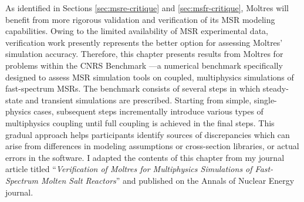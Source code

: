 As identified in Sections \ref{sec:msre-critique} and \ref{sec:msfr-critique},
Moltres will benefit from more rigorous validation and verification of its
\gls{MSR} modeling capabilities. Owing to the limited availability of \gls{MSR}
experimental data, verification work presently represents the better option for
assessing Moltres' simulation accuracy. Therefore, this chapter presents
results from Moltres for problems within the CNRS Benchmark
\cite{tiberga_results_2020}---a numerical benchmark specifically designed to
assess \gls{MSR} simulation tools on coupled, multiphysics simulations of
fast-spectrum \glspl{MSR}. The benchmark consists of several steps in which
steady-state and transient simulations are prescribed. Starting from simple,
single-physics cases, subsequent steps incrementally introduce various types of
multiphysics coupling until full coupling is achieved in the final steps. This
gradual approach helps participants identify sources of discrepancies
which can arise from differences in modeling assumptions or
cross-section libraries, or actual errors in the software. I adapted the
contents of this chapter from my journal article titled
``\textit{Verification of Moltres for Multiphysics Simulations of Fast-Spectrum
Molten Salt Reactors}'' and published on the Annals of Nuclear Energy journal.






